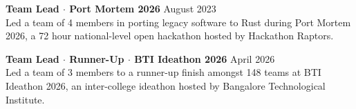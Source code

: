 \item{
    \textbf{Team Lead $\cdot$ Port Mortem 2026} \hfill {August 2023} \\
    Led a team of 4 members in porting legacy software to Rust during Port Mortem 2026, a 72 hour national-level open hackathon hosted by Hackathon Raptors. \\
}
\item{
    \textbf{Team Lead $\cdot$ Runner-Up $\cdot$ BTI Ideathon 2026} \hfill {April 2026} \\
    Led a team of 3 members to a runner-up finish amongst 148 teams at BTI Ideathon 2026, an inter-college ideathon hosted by Bangalore Technological Institute. \\
}
